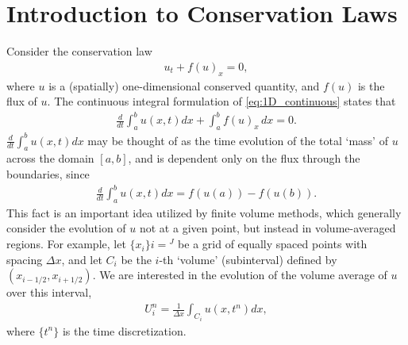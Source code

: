 \label{lab:finitevolume}

\section*{Introduction to Conservation Laws}
Consider the conservation law
\begin{align}\label{eq:1D_continuous}
u_t + f(u)_x = 0,
\end{align}
where $u$ is a (spatially) one-dimensional conserved quantity, and $f(u)$ is the flux of $u$.  The continuous integral formulation of  \eqref{eq:1D_continuous} states that 
\begin{align*}
	\frac{d}{dt}\int_a^b u(x,t) dx + \int_a^b f(u)_x \,dx = 0.
\end{align*}
$\frac{d}{dt}\int_a^b u(x,t) dx$ may be thought of as the time evolution of the total `mass' of $u$ across the domain $[a,b]$, and is 
 dependent only on the flux through the boundaries, since 
\begin{align*}
\frac{d}{dt}\int_a^b u(x,t) dx = f(u(a))-f(u(b)).
\end{align*}
This fact is an important idea utilized by finite volume methods, which generally consider the evolution of $u$ not at a given point, but instead in volume-averaged regions.  For example, let $\{x_i\}{i = }^J$ be a grid of equally spaced points with spacing  $\Delta x$, and let $C_i$ be the $i$-th `volume' (subinterval) defined by $(x_{i-1/2},x_{i+1/2})$. We are interested in the evolution of the volume average of $u$ over this interval,
\begin{align*}
U_i^n  = \frac{1}{\Delta x}\int_{C_i} u(x,t^n)dx,
\end{align*}
where $\{t^n\}$ is the time discretization.

